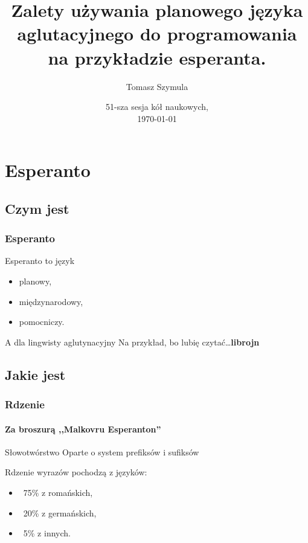 \documentclass{beamer}
\title[Esperanto w programowaniu]{Zalety używania planowego języka aglutacyjnego do programowania na przykładzie esperanta.}
\author{Tomasz Szymula}
\institute[PEJ]{Koło naukowe Blabel, AGH}
\date[2014]{51-sza sesja kół naukowych,\\ \today}
\begin{document}
  \frame{\titlepage}
 
  \section{Esperanto}
  \subsection{Czym jest} 
  
  \begin{frame}
  	\frametitle{Esperanto}
  	
  	\begin{block}{Esperanto to język}
  		\begin{itemize}
  			\item planowy,
			\item międzynarodowy,
			\item pomocniczy.
		\end{itemize}
  	\end{block}
  	
  	\pause

	\begin{block}{A dla lingwisty aglutynacyjny}
		Na przykład, bo lubię czytać\dots \textbf{\textcolor{antiquefuchsia}{libr}o\textcolor{ao(english)}{j}\textcolor{blue(pigment)}{n}}
	\end{block}  	
  	
  \end{frame}
 
  
  
  \subsection{Jakie jest}
  
  \begin{frame}
  	\frametitle{Rdzenie}
  	\framesubtitle{Za broszurą ,,Malkovru Esperanton''}
  	
  	\begin{block}{Słowotwórstwo}
  		Oparte o system prefiksów i sufiksów
  	\end{block}
	Rdzenie wyrazów pochodzą z języków:
	\begin{itemize}
		\item ~75\% z romańskich,
		\item ~20\% z germańskich,
		\item ~5\% z innych.
	\end{itemize}
		
  \end{frame}
  
\end{document}
